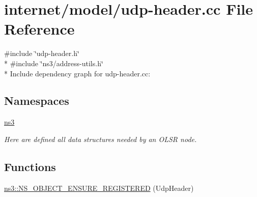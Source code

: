 \hypertarget{udp-header_8cc}{}\section{internet/model/udp-\/header.cc File Reference}
\label{udp-header_8cc}
{\ttfamily \#include \char`\"{}udp-\/header.\+h\char`\"{}}\\*
{\ttfamily \#include \char`\"{}ns3/address-\/utils.\+h\char`\"{}}\\*
Include dependency graph for udp-\/header.cc\+:
\subsection*{Namespaces}
\begin{DoxyCompactItemize}
\item 
 \hyperlink{namespacens3}{ns3}
\begin{DoxyCompactList}\small\item\em Here are defined all data structures needed by an O\+L\+SR node. \end{DoxyCompactList}\end{DoxyCompactItemize}
\subsection*{Functions}
\begin{DoxyCompactItemize}
\item 
\hyperlink{namespacens3_a02244a0180e797d603aa99d61f5343df}{ns3\+::\+N\+S\+\_\+\+O\+B\+J\+E\+C\+T\+\_\+\+E\+N\+S\+U\+R\+E\+\_\+\+R\+E\+G\+I\+S\+T\+E\+R\+ED} (Udp\+Header)
\end{DoxyCompactItemize}
